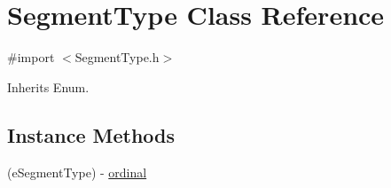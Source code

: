 \hypertarget{interface_segment_type}{}\section{Segment\+Type Class Reference}
\label{interface_segment_type}


{\ttfamily \#import $<$Segment\+Type.\+h$>$}



Inherits Enum.

\subsection*{Instance Methods}
\begin{DoxyCompactItemize}
\item 
(e\+Segment\+Type) -\/ \hyperlink{interface_segment_type_a13b0063e2054277c7b036f7c93ddf63d}{ordinal}
\end{DoxyCompactItemize}
